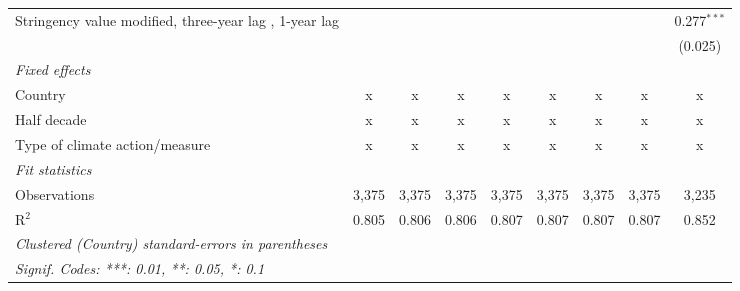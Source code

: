 \begin{table}[htbp]
\begin{tabular}{lcccccccc}
      Stringency value modified, three-year lag , 1-year lag                        &               &                &                &                &                &                &                & 0.277$^{***}$\\   
                                                                                    &               &                &                &                &                &                &                & (0.025)\\   
      \emph{Fixed effects}\\
      Country                                                                       & x             & x              & x              & x              & x              & x              & x              & x\\  
      Half decade                                                                   & x             & x              & x              & x              & x              & x              & x              & x\\  
      Type of climate action/measure                                                & x             & x              & x              & x              & x              & x              & x              & x\\  
      \midrule \emph{Fit statistics}\\
      Observations                                                                  & 3,375         & 3,375          & 3,375          & 3,375          & 3,375          & 3,375          & 3,375          & 3,235\\  
      R$^2$                                                                         & 0.805         & 0.806          & 0.806          & 0.807          & 0.807          & 0.807          & 0.807          & 0.852\\  
      \midrule
      \multicolumn{9}{l}{\emph{Clustered (Country) standard-errors in parentheses}}\\
      \multicolumn{9}{l}{\emph{Signif. Codes: ***: 0.01, **: 0.05, *: 0.1}}\\
   \end{tabular}
\end{table}


